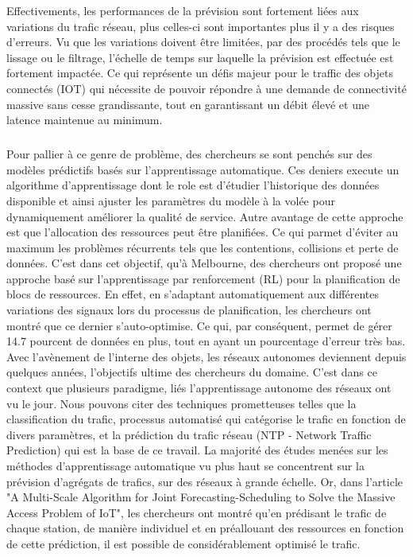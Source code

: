 \documentclass[12pt]{article}
\begin{document}
Effectivements, les performances de la prévision sont fortement liées aux variations du trafic réseau, plus celles-ci sont importantes plus il y a des risques d'erreurs. Vu que les variations doivent être limitées, par des procédés tels que le lissage ou le filtrage, l'échelle de temps sur laquelle la prévision est effectuée est fortement impactée.
Ce qui représente un défis majeur pour le traffic des objets connectés (IOT) qui nécessite de pouvoir répondre à une demande de connectivité massive sans cesse grandissante, tout en garantissant un débit élevé et une latence maintenue au minimum.
\subparagraph{}Pour pallier à ce genre de problème, des chercheurs se sont penchés sur des modèles prédictifs basés sur l'apprentissage automatique. Ces deniers execute un algorithme d'apprentissage dont le role est d'étudier l'historique des données disponible et ainsi ajuster les paramètres du modèle à la volée pour dynamiquement améliorer la qualité de service.
Autre avantage de cette approche est que l'allocation des ressources peut être planifiées. Ce qui parmet d'éviter au maximum les problèmes récurrents tels que les contentions, collisions et perte de données.
C'est dans cet objectif, qu'à Melbourne, des chercheurs ont proposé une approche basé sur l'apprentissage par renforcement (RL) pour la planification de blocs de ressources. 
En effet, en s'adaptant automatiquement aux différentes variations des signaux lors du processus de planification, les chercheurs ont montré que ce dernier s'auto-optimise. Ce qui, par conséquent, permet de gérer 14.7 pourcent de données en plus, tout en ayant un pourcentage d'erreur très bas. 
Avec l'avènement de l'interne des objets, les réseaux autonomes deviennent depuis quelques années, l'objectifs ultime des chercheurs du domaine. C'est dans ce context que plusieurs paradigme, liés l'apprentissage autonome des réseaux ont vu le jour.
Nous pouvons citer des techniques prometteuses telles que la classification du trafic, processus automatisé qui catégorise le trafic en fonction de divers paramètres, et la prédiction du trafic réseau (NTP - Network Traffic Prediction) qui est la base de ce travail.
La majorité des études menées sur les méthodes d'apprentissage automatique vu plus haut se concentrent sur la prévision d'agrégats de trafics, sur des réseaux à grande échelle. Or, dans l'article "A Multi-Scale Algorithm for Joint Forecasting-Scheduling to Solve the Massive Access Problem of IoT", les chercheurs ont montré qu'en prédisant le trafic de chaque station, de manière individuel et en préallouant des ressources en fonction de cette prédiction, il est possible de considérablement optimisé le trafic.  
\nocite{*}


\end{document}
